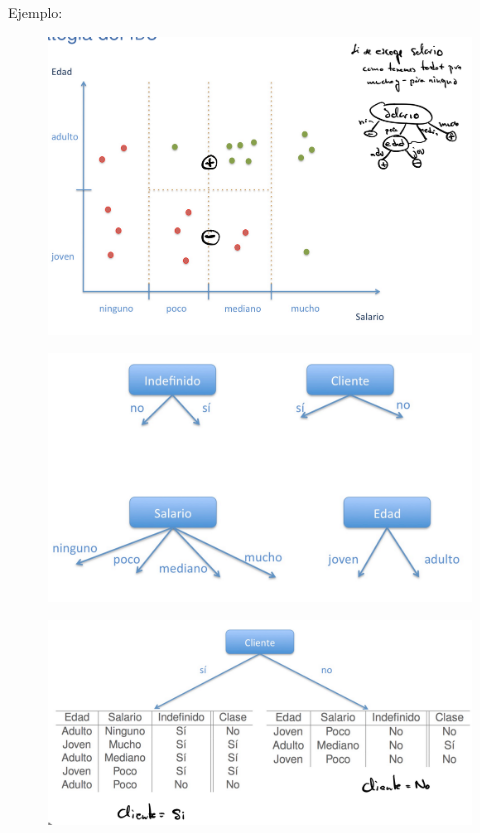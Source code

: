 \documentclass[12pt]{report} %
\begin{document}
  Ejemplo:
\begin{figure}[H]
	{\includegraphics[scale=.2]{Untitled 3.png}}
\end{figure}
\begin{figure}[H]
	{\includegraphics[scale=.2]{Untitled 4.png}}

\end{figure}
\begin{figure}[H]
	{\includegraphics[scale=.2]{Untitled 5.png}}
\end{figure}
\end{document}
